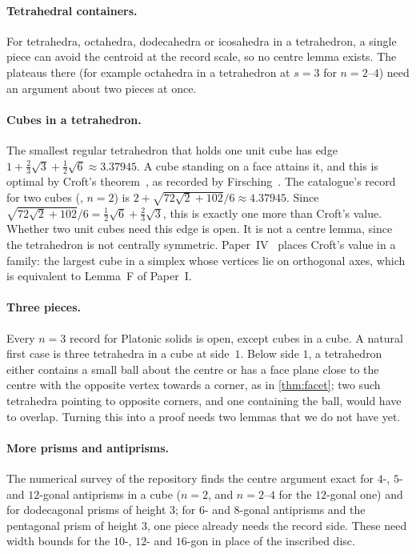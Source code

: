 \documentclass[11pt,a4paper]{article}
\begin{document}
\paragraph{Tetrahedral containers.} For tetrahedra, octahedra, dodecahedra or icosahedra in a tetrahedron, a single piece can avoid the centroid at the record scale, so no centre lemma exists. The plateaus there (for example octahedra in a tetrahedron at $s=3$ for $n=2$--$4$) need an argument about two pieces at once.

\paragraph{Cubes in a tetrahedron.} The smallest regular tetrahedron that holds one unit cube has edge $1+\frac23\sqrt3+\frac12\sqrt6\approx3.37945$. A cube standing on a face attains it, and this is optimal by Croft's theorem~\cite{croft}, as recorded by Firsching~\cite{firsching}. The catalogue's record for two cubes (, $n=2$) is $2+\sqrt{72\sqrt2+102}/6\approx4.37945$. Since $\sqrt{72\sqrt2+102}/6=\frac12\sqrt6+\frac23\sqrt3$, this is exactly one more than Croft's value. Whether two unit cubes need this edge is open. It is not a centre lemma, since the tetrahedron is not centrally symmetric. Paper~IV~\cite{alldims} places Croft's value in a family: the largest cube in a simplex whose vertices lie on orthogonal axes, which is equivalent to Lemma~F of Paper~I.

\paragraph{Three pieces.} Every $n=3$ record for Platonic solids is open, except cubes in a cube. A natural first case is three tetrahedra in a cube at side~$1$. Below side $1$, a tetrahedron either contains a small ball about the centre or has a face plane close to the centre with the opposite vertex towards a corner, as in \cref{thm:facet}; two such tetrahedra pointing to opposite corners, and one containing the ball, would have to overlap. Turning this into a proof needs two lemmas that we do not have yet.

\paragraph{More prisms and antiprisms.} The numerical survey of the repository finds the centre argument exact for $4$-, $5$- and $12$-gonal antiprisms in a cube ($n=2$, and $n=2$--$4$ for the $12$-gonal one) and for dodecagonal prisms of height $3$; for $6$- and $8$-gonal antiprisms and the pentagonal prism of height $3$, one piece already needs the record side. These need width bounds for the $10$-, $12$- and $16$-gon in place of the inscribed disc.
\end{document}
